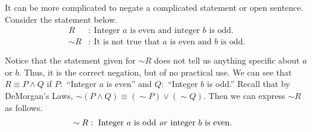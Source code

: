 \documentclass[12 pt]{article}
\theoremstyle{definition}
\theoremstyle{plain}
\theoremstyle{mytheorem}
\theoremstyle{myexample}
\theoremstyle{mydefinition}
\begin{document}
\noindent It can be more complicated to negate a complicated statement or open sentence.  Consider the statement below.
	\begin{align*}
	R &: \ \mbox{Integer $a$ is even and integer $b$ is odd.}\\
	\sim R&: \ \mbox{It is not true that $a$ is even and $b$ is odd.}
	\end{align*}

Notice that the statement given for $\sim R$ does not tell us anything specific about $a$ or $b$.  Thus, it is the correct negation, but of no practical use.  We can see that $R \equiv P \wedge Q$ if $P:$ ``Integer $a$ is even'' and $Q:$ ``Integer $b$ is odd.''  Recall that by DeMorgan's Laws, $\sim (P \wedge Q) \equiv (\sim P) \vee (\sim Q)$.  Then we can express $\sim R$ as follows.
	\begin{align*}
	\sim R &: \ \mbox{Integer $a$ is odd \textit{or} integer $b$ is even.}
	\end{align*}
	
	
\end{document}

